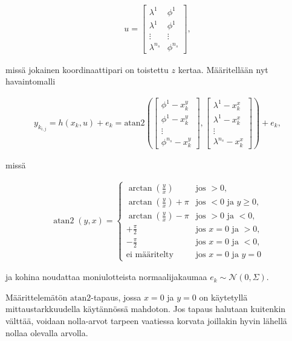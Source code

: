\documentclass[
  12pt,
  a4paper, twoside]{book}
\begin{document}
\begin{align}
u=\begin{bmatrix} \lambda^1 & \phi^1 \\  \lambda^1 & \phi^1 \\  \vdots & \vdots \\ \lambda^{n_s} & \phi^{n_s} \end{bmatrix},
\end{align}

\noindent missä jokainen koordinaattipari on toistettu \(z\) kertaa. Määritellään nyt havaintomalli

\begin{align}\label{havaintomalli}
y_{k_{i,j}}=h(x_k, u)+e_k=\text{atan2} \left( \begin{bmatrix}\phi^1-x_k^y\\ \phi^1-x_k^y\\ \vdots \\ \phi^{n_s}-x_k^y\end{bmatrix}, \begin{bmatrix}\lambda^1-x_k^x\\ \lambda^1-x_k^x\\ \vdots \\ \lambda^{n_s}-x_k^x\end{bmatrix} \right) +e_k,
\end{align}

\noindent missä

\begin{align}\label{atan2}
\displaystyle \operatorname{atan2}(y,x)={\begin{cases}\arctan({\frac {y}{x}})&{\text{jos }}>0,\\\arctan({\frac {y}{x}})+\pi &{\text{jos }}<0{\text{ ja }}y\geq 0,\\\arctan({\frac {y}{x}})-\pi & {\text{jos }}>0{\text{ ja }}<0,\\+{\frac {\pi }{2}}&{\text{jos }}x=0{\text{ ja }}>0,\\-{\frac {\pi }{2}}&{\text{jos }}x=0{\text{ ja }}<0,\\{\text{ei määritelty}}&{\text{jos }}x=0{\text{ ja }}y=0\end{cases}}
\end{align}

\noindent ja kohina noudattaa moniulotteista normaalijakaumaa \(e_k\sim\mathcal{N}(0,{\Sigma})\).

Määrittelemätön \(\text{atan2}\)-tapaus, jossa \(x=0\) ja \(y=0\) on käytetyllä mittaustarkkuudella käytännössä mahdoton. Jos tapaus halutaan kuitenkin välttää, voidaan nolla-arvot tarpeen vaatiessa korvata joillakin hyvin lähellä nollaa olevalla arvolla.
\end{document}

